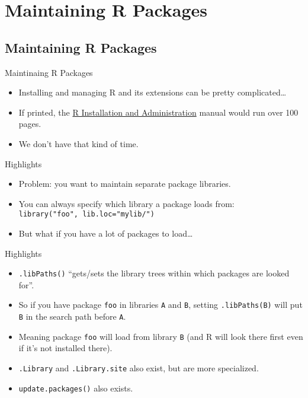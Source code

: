 \section{Maintaining R Packages}
\makesubcontentsslides


\subsection{Maintaining R Packages}

\begin{frame}
  \begin{block}{Maintinaing R Packages}
    \begin{itemize}
      \item Installing and managing R and its extensions can be pretty 
complicated\dots
      \item If printed, the 
\href{http://cran.r-project.org/doc/manuals/r-release/R-admin.html}{R 
Installation and Administration} manual would run over 100 pages.
      \item We don't have that kind of time.
    \end{itemize}
  \end{block}
\end{frame}


\begin{frame}
  \begin{block}{Highlights}
    \begin{itemize}
      \item Problem: you want to maintain separate package libraries.
      \item You can always specify which library a package loads from: \\
\texttt{library("foo", lib.loc="mylib/")}
      \item But what if you have a lot of packages to load\dots
    \end{itemize}
  \end{block}
\end{frame}



\begin{frame}
  \begin{block}{Highlights}
    \begin{itemize}
      \item \texttt{.libPaths()} ``gets/sets the library trees within which 
packages are looked for''.
      \item So if you have package \texttt{foo} in libraries \texttt{A} and 
\texttt{B}, setting \texttt{.libPaths(B)} will put \texttt{B} in the search 
path before \texttt{A}.
      \item Meaning package \texttt{foo} will load from library \texttt{B} (and 
R will look there first even if it's not installed there).
      \item \texttt{.Library} and \texttt{.Library.site} also exist, but are 
more specialized.
      \item \texttt{update.packages()} also exists.
  \end{itemize}
  \end{block}
\end{frame}


